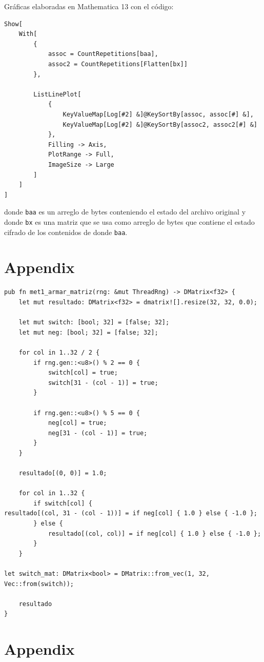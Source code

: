 \documentclass[a4paper]{article}
\begin{document}
Gráficas elaboradas en Mathematica 13 con el código:

\begin{verbatim}
Show[
    With[
        {
            assoc = CountRepetitions[baa],
            assoc2 = CountRepetitions[Flatten[bx]]
        },

        ListLinePlot[
            {
                KeyValueMap[Log[#2] &]@KeySortBy[assoc, assoc[#] &],
                KeyValueMap[Log[#2] &]@KeySortBy[assoc2, assoc2[#] &]
            },
            Filling -> Axis,
            PlotRange -> Full,
            ImageSize -> Large
        ]
    ]
]
\end{verbatim}

donde \texttt{baa} es un arreglo de bytes conteniendo el estado del archivo
original y donde \texttt{bx} es una matriz que se usa como arreglo de bytes que
contiene el estado cifrado de los contenidos de donde \texttt{baa}.

\newpage
\section{Appendix}

\begin{verbatim}
pub fn met1_armar_matriz(rng: &mut ThreadRng) -> DMatrix<f32> {
    let mut resultado: DMatrix<f32> = dmatrix![].resize(32, 32, 0.0);

    let mut switch: [bool; 32] = [false; 32];
    let mut neg: [bool; 32] = [false; 32];

    for col in 1..32 / 2 {
        if rng.gen::<u8>() % 2 == 0 {
            switch[col] = true;
            switch[31 - (col - 1)] = true;
        }

        if rng.gen::<u8>() % 5 == 0 {
            neg[col] = true;
            neg[31 - (col - 1)] = true;
        }
    }

    resultado[(0, 0)] = 1.0;

    for col in 1..32 {
        if switch[col] {
resultado[(col, 31 - (col - 1))] = if neg[col] { 1.0 } else { -1.0 };
        } else {
            resultado[(col, col)] = if neg[col] { 1.0 } else { -1.0 };
        }
    }

let switch_mat: DMatrix<bool> = DMatrix::from_vec(1, 32, Vec::from(switch));

    resultado
}
\end{verbatim}

\newpage
\section{Appendix}
\end{document}
